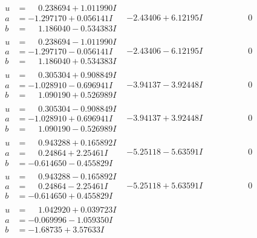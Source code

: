 \documentclass[1p]{elsarticle_modified}
\theoremstyle{definition}
\begin{document}
$$\begin{array}{c|c|c}
\begin{aligned}
u &= \phantom{-}0.238694 + 1.011990 I \\
a &= -1.297170 + 0.056141 I \\
b &= \phantom{-}1.186040 - 0.534383 I\end{aligned}
 & -2.43406 + 6.12195 I & \phantom{-0.000000 } 0 \\ \hline\begin{aligned}
u &= \phantom{-}0.238694 - 1.011990 I \\
a &= -1.297170 - 0.056141 I \\
b &= \phantom{-}1.186040 + 0.534383 I\end{aligned}
 & -2.43406 - 6.12195 I & \phantom{-0.000000 } 0 \\ \hline\begin{aligned}
u &= \phantom{-}0.305304 + 0.908849 I \\
a &= -1.028910 - 0.696941 I \\
b &= \phantom{-}1.090190 + 0.526989 I\end{aligned}
 & -3.94137 - 3.92448 I & \phantom{-0.000000 } 0 \\ \hline\begin{aligned}
u &= \phantom{-}0.305304 - 0.908849 I \\
a &= -1.028910 + 0.696941 I \\
b &= \phantom{-}1.090190 - 0.526989 I\end{aligned}
 & -3.94137 + 3.92448 I & \phantom{-0.000000 } 0 \\ \hline\begin{aligned}
u &= \phantom{-}0.943288 + 0.165892 I \\
a &= \phantom{-}0.24864 + 2.25461 I \\
b &= -0.614650 - 0.455829 I\end{aligned}
 & -5.25118 - 5.63591 I & \phantom{-0.000000 } 0 \\ \hline\begin{aligned}
u &= \phantom{-}0.943288 - 0.165892 I \\
a &= \phantom{-}0.24864 - 2.25461 I \\
b &= -0.614650 + 0.455829 I\end{aligned}
 & -5.25118 + 5.63591 I & \phantom{-0.000000 } 0 \\ \hline\begin{aligned}
u &= \phantom{-}1.042920 + 0.039723 I \\
a &= -0.069996 - 1.059350 I \\
b &= -1.68735 + 3.57633 I\end{aligned}

\end{array}$$
\end{document}
